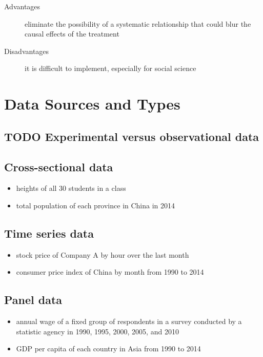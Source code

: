 \documentclass[a4paper,11pt]{article}
\begin{document}
\begin{description}
\item[{Advantages}] eliminate the possibility of a systematic relationship that could
blur the causal effects of the treatment

\item[{Disadvantages}] it is difficult to implement, especially for social
science
\end{description}


\section{Data Sources and Types}
\label{sec:org04139b4}
\subsection{{\bfseries\sffamily TODO} Experimental versus observational data}
\label{sec:orge08787e}

\subsection{Cross-sectional data}
\label{sec:org73d411d}

\begin{itemize}
\item heights of all 30 students in a class

\item total population of each province in China in 2014
\end{itemize}

\subsection{Time series data}
\label{sec:orgfe73d04}

\begin{itemize}
\item stock price of Company A by hour over the last month

\item consumer price index of China by month from 1990 to 2014
\end{itemize}

\subsection{Panel data}
\label{sec:org64ab29d}

\begin{itemize}
\item annual wage of a fixed group of respondents in a survey conducted by
a statistic agency in 1990, 1995, 2000, 2005, and 2010

\item GDP per capita of each country in Asia from 1990 to 2014
\end{itemize}
\end{document}
